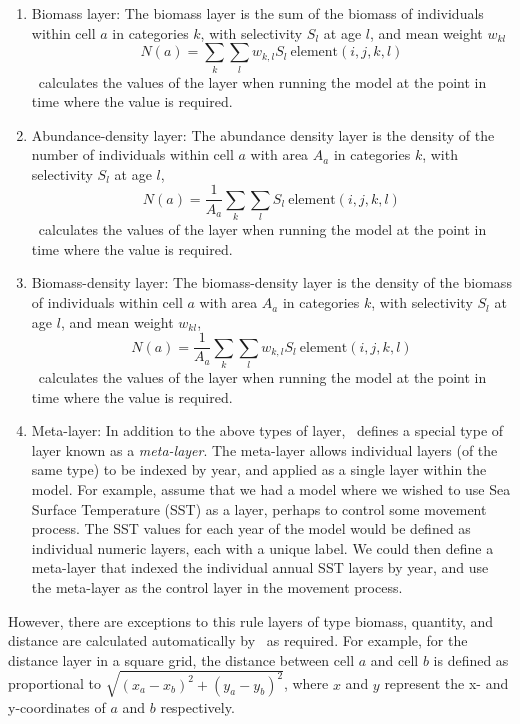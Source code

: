 \begin{enumerate}
\item {Biomass layer}: The biomass layer is the sum of the biomass of individuals within cell $a$ in categories $k$, with selectivity $S_l$ at age $l$, and mean weight $w_{kl}$
\begin{equation}
  N(a) = \sum\limits_{k} \sum\limits_l w_{k,l} S_l \ \text{element}(i,j,k,l) 
\end{equation}
\SPM\ calculates the values of the layer when running the model at the point in time where the value is required.

\item {Abundance-density layer}: The abundance density layer is the density of the number of individuals within cell $a$ with area $A_a$ in categories $k$, with selectivity $S_l$ at age $l$,
\begin{equation}
  N(a) = \frac{1}{A_a} \sum\limits_{k} \sum\limits_l S_l \ \text{element}(i,j,k,l)
\end{equation}
\SPM\ calculates the values of the layer when running the model at the point in time where the value is required.

\item {Biomass-density layer}: The biomass-density layer is the density of the biomass of individuals within cell $a$ with area $A_a$ in categories $k$, with selectivity $S_l$ at age $l$, and mean weight $w_{kl}$,
\begin{equation}
  N(a) = \frac{1}{A_a} \sum\limits_{k} \sum\limits_l w_{k,l} S_l \ \text{element}(i,j,k,l)
\end{equation}
\SPM\ calculates the values of the layer when running the model at the point in time where the value is required.

\item {Meta-layer\label{meta-layer}}: In addition to the above types of layer, \SPM\ defines a special type of layer known as a \emph{meta-layer}. The meta-layer allows individual layers (of the same type) to be indexed by year, and applied as a single layer within the model. For example, assume that we had a model where we wished to use Sea Surface Temperature (SST) as a layer, perhaps to control some movement process. The SST values for each year of the model would be defined as individual numeric layers, each with a unique label. We could then define a meta-layer that indexed the individual annual SST layers by year, and use the meta-layer as the control layer in the movement process. 
\end{enumerate}

However, there are  exceptions to this rule \textemdash layers of type biomass, quantity, and distance are calculated automatically by \SPM\ as required. For example, for the distance layer in a square grid, the distance between cell $a$ and cell $b$ is defined as proportional to $\sqrt{(x_a-x_b)^2 +(y_a-y_b)^2}$, where $x$ and $y$ represent the x- and y-coordinates of $a$ and $b$ respectively.

